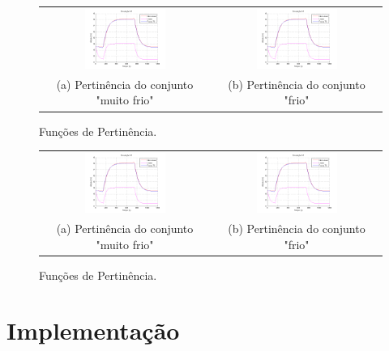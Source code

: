 \begin{figure}[H]
	\centering
	\begin{tabular}{cc}
		\includegraphics[width=0.5\textwidth,keepaspectratio]{img/FM_h1_5_10_15.png} &
		\includegraphics[width=0.5\textwidth,keepaspectratio]{img/FM_h1_5_10_15.png} \\
		(a) Pertinência do conjunto "muito frio" &
		(b) Pertinência do conjunto "frio"
	\end{tabular}
	\caption{\label{imgTS5} Funções de Pertinência.}
\end{figure}

\begin{figure}[H]
	\centering
	\begin{tabular}{cc}
		\includegraphics[width=0.5\textwidth,keepaspectratio]{img/FM_h1_5_10_15.png} &
		\includegraphics[width=0.5\textwidth,keepaspectratio]{img/FM_h1_5_10_15.png} \\
		(a) Pertinência do conjunto "muito frio" &
		(b) Pertinência do conjunto "frio"
	\end{tabular}
	\caption{\label{imgTS15} Funções de Pertinência.}
\end{figure}

\section{Implementação}

%

